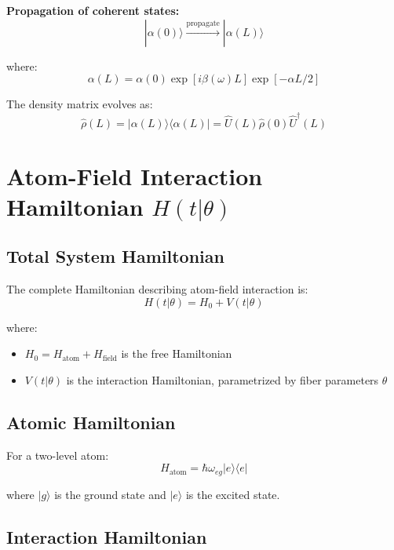 \documentclass[12pt,a4paper]{article}
\begin{document}
\textbf{Propagation of coherent states:}
\begin{equation}
|\alpha(0)\rangle \xrightarrow{\text{propagate}} |\alpha(L)\rangle
\end{equation}

where:
\begin{equation}
\alpha(L) = \alpha(0) \exp[i\beta(\omega)L]\exp[-\alpha L/2]
\end{equation}

The density matrix evolves as:
\begin{equation}
\hat{\rho}(L) = |\alpha(L)\rangle\langle\alpha(L)| = \hat{U}(L)\hat{\rho}(0)\hat{U}^\dagger(L)
\end{equation}

\section{Atom-Field Interaction Hamiltonian $H(t|\theta)$}

\subsection{Total System Hamiltonian}

The complete Hamiltonian describing atom-field interaction is:
\begin{equation}
H(t|\theta) = H_0 + V(t|\theta)
\end{equation}

where:
\begin{itemize}
\item $H_0 = H_{\text{atom}} + H_{\text{field}}$ is the free Hamiltonian
\item $V(t|\theta)$ is the interaction Hamiltonian, parametrized by fiber parameters $\theta$
\end{itemize}

\subsection{Atomic Hamiltonian}

For a two-level atom:
\begin{equation}
H_{\text{atom}} = \hbar\omega_{eg}|e\rangle\langle e|
\end{equation}

where $|g\rangle$ is the ground state and $|e\rangle$ is the excited state.

\subsection{Interaction Hamiltonian}
\end{document}
